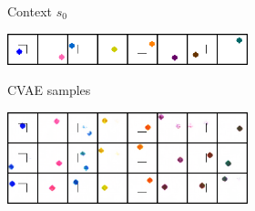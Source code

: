 
\begin{figure}[b]
    \centering
    \vspace{-0.5cm}
    \begin{subfigure}[b]{0.49\textwidth}
        \begin{subfigure}[b]{0.4\textwidth}
            \center
            Context $s_0$ \vspace{0.2cm}
        \end{subfigure}
        \begin{subfigure}[b]{0.59\textwidth}
             {
                \includegraphics[width=1.7\linewidth]{img/cvae_samples/wall_pointmass1_x0.png}
            }
        \end{subfigure}

        \vspace{0.1cm}

        \begin{subfigure}[b]{0.4\textwidth}
            \center
            CVAE samples \vspace{1cm}
        \end{subfigure}
        \begin{subfigure}[b]{0.59\textwidth}
             {
                \includegraphics[width=1.7\linewidth]{img/cvae_samples/wall_pointmass1_cvae_samples.png}
            }
        \end{subfigure}

        \vspace{0.1cm}


\end{subfigure}
\end{figure}
